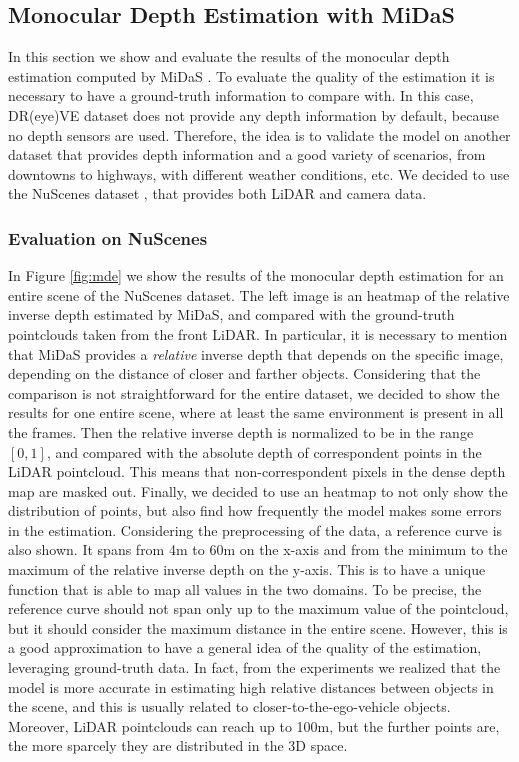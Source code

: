 \subsection{Monocular Depth Estimation with MiDaS}
In this section we show and evaluate the results of the monocular depth estimation 
computed by MiDaS \cite{midas}. To evaluate the quality of the estimation it 
is necessary to have a ground-truth information to compare with. In this case, 
DR(eye)VE dataset does not provide any depth information by default, because no 
depth sensors are used. 
Therefore, the idea is to validate the model on another 
dataset that provides depth information and a good variety of scenarios, from 
downtowns to highways, with different weather conditions, etc. 
We decided to use the NuScenes dataset \cite{nuscenes}, that provides both 
LiDAR and camera data.

\subsubsection*{Evaluation on NuScenes}
In Figure \ref{fig:mde} we show the results of the monocular depth estimation 
for an entire scene of the NuScenes dataset. The left image is an heatmap of 
the relative inverse depth estimated by MiDaS, and compared with the ground-truth 
pointclouds taken from the front LiDAR. In particular, it is necessary to mention 
that MiDaS provides a \emph{relative} inverse depth that depends on the specific 
image, depending on the distance of closer and farther objects.
Considering that the comparison is not straightforward for the entire dataset, 
we decided to show the results for one entire scene, where at least the same 
environment is present in all the frames. Then the relative inverse depth is 
normalized to be in the range $[0, 1]$, and compared with the absolute depth 
of correspondent points in the LiDAR pointcloud. This means that non-correspondent 
pixels in the dense depth map are masked out.
Finally, we decided to use an heatmap to not only show the distribution of points, 
but also find how frequently the model makes some errors in the estimation.
Considering the preprocessing of the data, a reference curve is also shown. 
It spans from 4m to 60m on the x-axis and from the 
minimum to the maximum of the relative inverse depth on the y-axis. This is to have 
a unique function that is able to map all values in the two domains.
To be precise, the reference curve should not span only up to the maximum 
value of the pointcloud, but it should consider the maximum distance in the 
entire scene. However, this is a good approximation to have a general idea 
of the quality of the estimation, leveraging ground-truth data. In fact, 
from the experiments we realized that the model is more accurate in estimating 
high relative distances between objects in the scene, and this is usually related 
to closer-to-the-ego-vehicle objects. Moreover, LiDAR pointclouds can reach 
up to 100m, but the further points are, the more sparcely they are distributed
in the 3D space.


